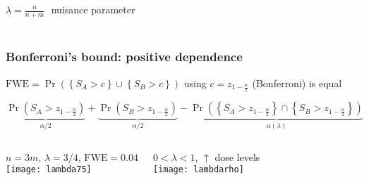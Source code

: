 \begin{frame}
\begin{columns}[t]
$\lambda= \frac{n}{n+m}\,\,$  nuisance parameter

\end{columns}


\end{frame}
\subsection{}
\begin{frame}
\frametitle{Bonferroni's bound: positive dependence} 

$\mathrm{FWE}=\Pr\left(\left\{S_A > c \right\} \cup \left\{S_B > c \right\} \right)$ using $c=z_{1-\frac{\alpha}{2}}$ (Bonferroni) is equal

\smallskip

$$\underbrace{\Pr\left(S_A>  z_{1-\frac{\alpha}{2}} \right)}_{\alpha/2}+ \underbrace{\Pr\left(S_B >  z_{1-\frac{\alpha}{2}} \right)}_{\alpha/2}  -\underbrace{ \Pr\left(\left\{S_A >  z_{1-\frac{\alpha}{2}} \right\} \cap \left\{S_B >  z_{1-\frac{\alpha}{2}} \right\} \right)}_{\alpha(\lambda)}$$

\bigskip

\begin{columns}[t]

\centering
\textcolor{cambridgedarkorange}{$n=3m$, $\lambda=3/4$, $\mathrm{FWE}=0.04$}\\
\texttt{[image: lambda75]}

\centering
\textcolor{cambridgedarkorange}{$0<\lambda<1$, $\uparrow$ dose levels}\\
\texttt{[image: lambdarho]}
\end{columns}

\end{frame}
